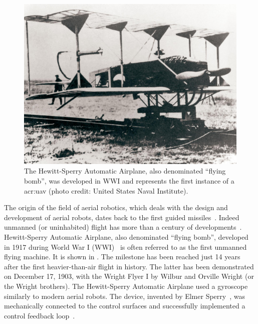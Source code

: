 \begin{figure}[t]
  \centering
  \includegraphics[width=.7\textwidth]{pictures/HA-NH-JA-19_1}
  \caption[Hewitt-Sperry Automatic Airplane, first unmanned flying machine]{The Hewitt-Sperry Automatic Airplane, also denominated ``flying bomb'', was developed in WWI and represents the first instance of a \Gls{acr:uav} {\scriptsize(photo credit: United States Naval Institute)}.}   
  \label{fig:hewitt-sperry}
\end{figure}

The origin of the field of aerial robotics, which deals with the design and development of aerial robots, dates back to the first guided missiles~\citep{siciliano2016springer}. Indeed unmanned (or uninhabited) flight has more than a century of developments~\citep{siciliano2016springer}. Hewitt-Sperry Automatic Airplane, also denominated ``flying bomb'', developed in 1917 during World War I (WWI)~\citep{keane2013brief,valavanis2015handbook} is often referred to as the first unmanned flying machine. It is shown in . The milestone has been reached just 14 years after the first heavier-than-air flight in history. The latter has been demonstrated on December 17, 1903, with the Wright Flyer I by Wilbur and Orville Wright (or the Wright brothers). The Hewitt-Sperry Automatic Airplane used a gyroscope similarly to modern aerial robots. The device, invented by Elmer Sperry~\citep{keane2013brief}, was mechanically connected to the control surfaces and successfully implemented a control feedback loop~\citep{siciliano2016springer}.


